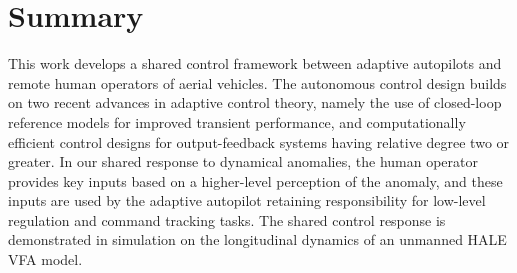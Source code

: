 \documentclass[english]{ifacconf}
\begin{document}
\section{Summary}\label{sec:summary}
This work develops a shared control framework between adaptive autopilots and remote human operators of aerial vehicles. The autonomous control design builds on two recent advances in adaptive control theory, namely the use of closed-loop reference models for improved transient performance, and computationally efficient control designs for output-feedback systems having relative degree two or greater. In our shared response to dynamical anomalies, the human operator provides key inputs based on a higher-level perception of the anomaly, and these inputs are used by the adaptive autopilot retaining responsibility for low-level regulation and command tracking tasks. The shared control response is demonstrated in simulation on the longitudinal dynamics of an unmanned HALE VFA model. 



%
\end{document}
